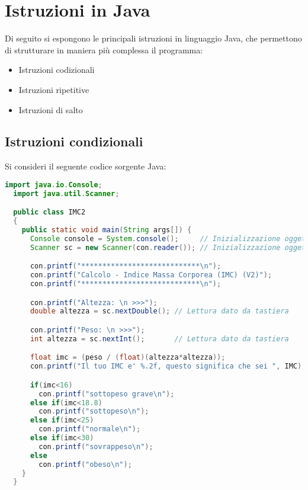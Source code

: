 \documentclass[a4paper]{extarticle}
\begin{document}
\newpage
\section{Istruzioni in Java}
Di seguito si espongono le principali istruzioni in linguaggio Java, che permettono di strutturare in maniera più complessa il programma:
\begin{itemize}
  \item Istruzioni codizionali
  \item Istruzioni ripetitive
  \item Istruzioni di salto
\end{itemize}

\vspace{1em}
\subsection{Istruzioni condizionali}
Si consideri il seguente codice sorgente Java:

\vspace{1em}
\noindent
\begin{lstlisting}[language=Java, caption=Esempio dell'istruzione condizionale if in Java]
  import java.io.Console;
  import java.util.Scanner;

  public class IMC2
  {
    public static void main(String args[]) {
      Console console = System.console();     // Inizializzazione oggetto Console
      Scanner sc = new Scanner(con.reader()); // Inizializzazione oggetto Scanner

      con.printf("****************************\n");
      con.printf("Calcolo - Indice Massa Corporea (IMC) (V2)");
      con.printf("****************************\n");

      con.printf("Altezza: \n >>>");
      double altezza = sc.nextDouble(); // Lettura dato da tastiera

      con.printf("Peso: \n >>>");
      int altezza = sc.nextInt();       // Lettura dato da tastiera

      float imc = (peso / (float)(altezza*altezza));
      con.printf("Il tuo IMC e' %.2f, questo significa che sei ", IMC);

      if(imc<16)
        con.printf("sottopeso grave\n");
      else if(imc<18.8)
        con.printf("sottopeso\n");
      else if(imc<25)
        con.printf("normale\n");
      else if(imc<30)
        con.printf("sovrappeso\n");
      else
        con.printf("obeso\n");
    }
  }
\end{lstlisting}
\end{document}
